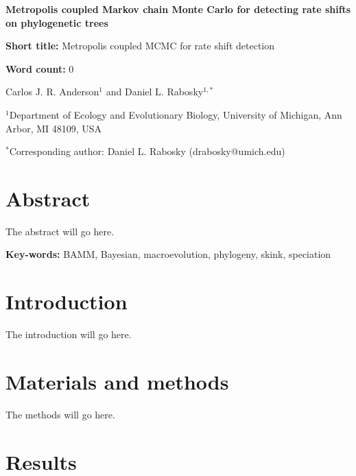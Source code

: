 \documentclass[12pt]{article}
\begin{document}
\baselineskip 24pt

\begin{flushleft}

{\Large\textbf{Metropolis coupled Markov chain Monte Carlo
    for detecting rate shifts on phylogenetic trees}}

\textbf{Short title:} Metropolis coupled MCMC for rate shift detection

\textbf{Word count:} 0

Carlos J. R. Anderson$^{1}$ and
Daniel L. Rabosky$^{1,*}$

$^{1}$Department of Ecology and Evolutionary Biology,
    University of Michigan, Ann Arbor, MI 48109, USA

$^{*}$Corresponding author: Daniel L. Rabosky (drabosky@umich.edu)

\end{flushleft}


\pagebreak[4]


\section*{Abstract}

The abstract will go here.

\begin{flushleft}
\textbf{Key-words:} BAMM, Bayesian, macroevolution, phylogeny, skink, speciation
\end{flushleft}


\pagebreak[4]


\section*{Introduction}

The introduction will go here.


\section*{Materials and methods}

The methods will go here.


\section*{Results}
\end{document}
